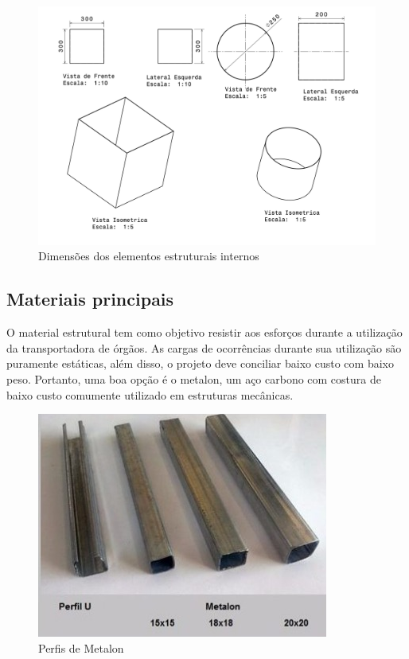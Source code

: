 \begin{figure}[H]
\centering
\includegraphics[scale=0.15]{figuras/caixas.png}
\caption{Dimensões dos elementos estruturais internos}
\end{figure}

\subsection{Materiais principais}

O material estrutural tem como objetivo resistir aos esforços durante a utilização da transportadora de órgãos. As cargas de ocorrências durante sua utilização são puramente estáticas, além disso, o projeto deve conciliar baixo custo com baixo peso. Portanto, uma boa opção é o metalon, um aço carbono com costura de baixo custo comumente utilizado em estruturas mecânicas.

\begin{figure}[H]
\centering
\includegraphics[scale=1]{figuras/metalon.png}
\caption{Perfis de Metalon}
\end{figure}

